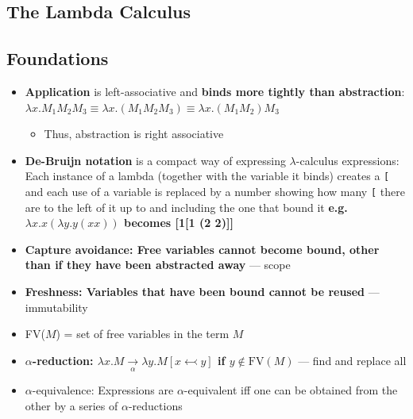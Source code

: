 \documentclass[20pt,a4paper,landscape]{extarticle}
\begin{document}
\tableofcontents
\clearpage
\begin{flushleft}
\section{The Lambda Calculus}
\subsection{Foundations}
\begin{itemize}
\item \textbf{Application} is left-associative and \textbf{binds more tightly than abstraction}: $\lambda x. M_1M_2M_3 \equiv \lambda x. (M_1M_2M_3) \equiv \lambda x. (M_1M_2)M_3$
    \begin{itemize}
    \item Thus, abstraction is right associative
    \end{itemize}
\item \textbf{De-Bruijn notation} is a compact way of expressing $\lambda$-calculus expressions: Each instance of a lambda (together with the variable it binds) creates a \verb|[| and each use of a variable is replaced by a number showing how many \verb|[| there are to the left of it up to and including the one that bound it \textbf{e.g. $\lambda x. x(\lambda y. y (x x))$ becomes [1[1 (2 2)]]}
\clearpage
\item \textbf{Capture avoidance: Free variables cannot become bound, other than if they have been abstracted away} — scope
\item \textbf{Freshness: Variables that have been bound cannot be reused} — immutability
\item FV($M$) = set of free variables in the term $M$
\item \textbf{$\alpha$-reduction: $\lambda x. M \underset{\alpha}{\rightarrow} \lambda y. M[x \leftarrowtail y]$ if $y \notin \textrm{FV}(M)$} — find and replace all
\item $\alpha$-equivalence: Expressions are $\alpha$-equivalent iff one can be obtained from the other by a series of $\alpha$-reductions
\end{itemize}
\clearpage

\end{flushleft}
\end{document}
